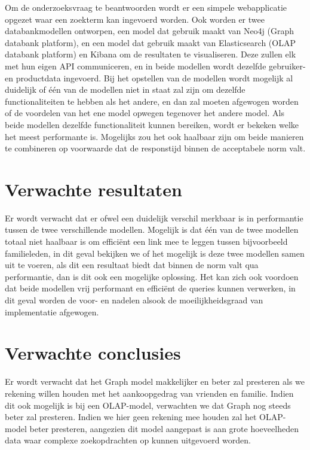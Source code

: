 Om de onderzoeksvraag te beantwoorden wordt er een simpele webapplicatie opgezet waar een zoekterm kan ingevoerd worden. Ook worden er twee databankmodellen ontworpen, een model dat gebruik maakt van Neo4j (Graph databank platform), en een model dat gebruik maakt van Elasticsearch (OLAP databank platform) en Kibana om de resultaten te visualiseren. Deze zullen elk met hun eigen API communiceren, en in beide modellen wordt dezelfde gebruiker- en productdata ingevoerd. Bij het opstellen van de modellen wordt mogelijk al duidelijk of één van de modellen niet in staat zal zijn om dezelfde functionaliteiten te hebben als het andere, en dan zal moeten afgewogen worden of de voordelen van het ene model opwegen tegenover het andere model. Als beide modellen dezelfde functionaliteit kunnen bereiken, wordt er bekeken welke het meest performante is. Mogelijks zou het ook haalbaar zijn om beide manieren te combineren op voorwaarde dat de responstijd binnen de acceptabele norm valt.


\section{Verwachte resultaten}
\label{sec:verwachte_resultaten}

Er wordt verwacht dat er ofwel een duidelijk verschil merkbaar is in performantie tussen de twee verschillende modellen. Mogelijk is dat één van de twee modellen totaal niet haalbaar is om efficiënt een link mee te leggen tussen bijvoorbeeld familieleden, in dit geval bekijken we of het mogelijk is deze twee modellen samen uit te voeren, als dit een resultaat biedt dat binnen de norm valt qua performantie, dan is dit ook een mogelijke oplossing.
 Het kan zich ook voordoen dat beide modellen vrij performant en efficiënt de queries kunnen verwerken, in dit geval worden de voor- en nadelen alsook de moeilijkheidsgraad van implementatie afgewogen.


\section{Verwachte conclusies}
\label{sec:verwachte_conclusies}

Er wordt verwacht dat het Graph model makkelijker en beter zal presteren als we rekening willen houden met het aankoopgedrag van vrienden en familie. Indien dit ook mogelijk is bij een OLAP-model, verwachten we dat Graph nog steeds beter zal presteren. Indien we hier geen rekening mee houden zal het OLAP-model beter presteren, aangezien dit model aangepast is aan grote hoeveelheden data waar complexe zoekopdrachten op kunnen uitgevoerd worden.


